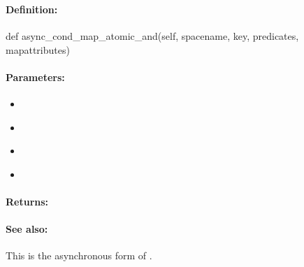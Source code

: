\pagebreak
\subsubsection{}
\label{api:python:async_cond_map_atomic_and}


\paragraph{Definition:}
\begin{pythoncode}
def async_cond_map_atomic_and(self, spacename, key, predicates, mapattributes)
\end{pythoncode}

\paragraph{Parameters:}
\begin{itemize}[noitemsep]
\item {}\\

\item {}\\

\item {}\\

\item {}\\

\end{itemize}

\paragraph{Returns:}


\paragraph{See also:}  This is the asynchronous form of .

\pagebreak
\subsubsection{}
\label{api:python:group_map_atomic_and}


